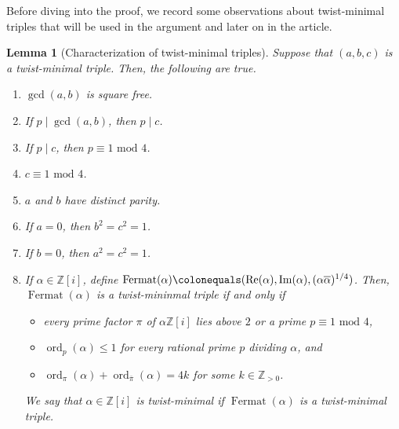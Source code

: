 \documentclass[12pt]{amsart}
\newcounter{counter}[section] %
\numberwithin{equation}{section} %
\newtheorem{lemma}[counter]{Lemma}
\theoremstyle{definition} \newtheorem{definition}[counter]{Definition}
\theoremstyle{remark} \newtheorem{nonexam}[counter]{Non-example}
\newcommand{\ZZ}{\mathbb{Z}} %
\newcommand{\md}{\text{ mod }} %
\newcommand{\cdef}[1]{\textsf{#1}} %
\renewcommand{\Re}{\mathrm{Re}} %
\renewcommand{\Im}{\mathrm{Im}} %
\newcommand{\ol}{\overline}
\DeclareMathOperator{\ord}{ord} %
\DeclareMathOperator{\Fermat}{Fermat} %
\begin{document}
Before diving into the proof, we record some observations about twist-minimal
triples that will be used in the argument and later on in the article.

\begin{lemma}[Characterization of twist-minimal triples]
  \label{lemma:twist-min-triples}
  Suppose that $(a,b,c)$ is a twist-minimal triple. Then, the
  following are true.
  \begin{enumerate}[label=(\alph*)]
  \item $\gcd(a,b)$ is square free.
  \item If $p \mid \gcd(a,b)$, then $p \mid c$.
  \item If $p \mid c$, then $p \equiv 1 \md 4$.
  \item $c \equiv 1 \md 4$.
  \item $a$ and $b$ have distinct parity.
  \item If $a = 0$, then $b^2 = c^2 = 1$.
  \item If $b = 0$, then $a^2 = c^2 = 1$.
  \item If $\alpha \in \ZZ[i]$, define
    $\Fermat(\alpha) \colonequals (\Re(\alpha), \Im(\alpha),
    (\alpha\ol{\alpha})^{1/4})$. Then, $\Fermat(\alpha)$ is a twist-mininmal triple if
    and only if
    \begin{itemize}
    \item every prime factor $\pi$ of $\alpha\ZZ[i]$ lies above $2$ or a prime
      $p \equiv 1 \md 4$,
      \item $\ord_p(\alpha) \leq 1$ for every rational prime $p$ dividing
        $\alpha$, and
      \item $\ord_\pi(\alpha) + \ord_{\ol{\pi}}(\alpha) = 4k$ for some
        $k \in\ZZ_{>0}$.
    \end{itemize}
    We say that $\alpha \in \ZZ[i]$ is \cdef{twist-minimal} if
    $\Fermat(\alpha)$ is a twist-minimal triple.
  \end{enumerate}
\end{lemma}
\end{document}
